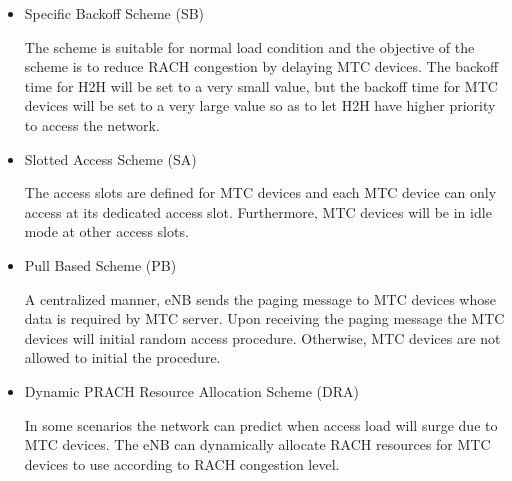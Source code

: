     \begin{itemize}
     \item Specific Backoff Scheme (SB)

            The scheme is suitable for normal load condition and the objective of the scheme is to reduce RACH congestion by delaying MTC devices. The backoff time for H2H will be set to a very small value, but the backoff time for MTC devices will be set to a very large value so as to let H2H have higher priority to access the network. 

     \item Slotted Access Scheme (SA)

            The access slots are defined for MTC devices and each MTC device can only access at its dedicated access slot. Furthermore, MTC devices will be in idle mode at other access slots.

     \item Pull Based Scheme (PB)

            A centralized manner, eNB sends the paging message to MTC devices whose data is required by MTC server. Upon receiving the paging message the MTC devices will initial random access procedure. Otherwise, MTC devices are not allowed to initial the procedure. 


      \item Dynamic PRACH Resource Allocation Scheme (DRA)

            In some scenarios the network can predict when access load will surge due to MTC devices. The eNB can dynamically allocate RACH resources for MTC devices to use according to RACH congestion level. 


\end{itemize}
